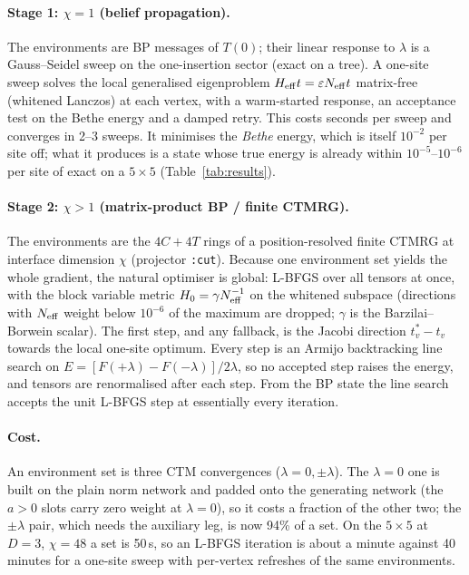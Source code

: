 \documentclass[11pt]{article}
\begin{document}
\paragraph{Stage 1: $\chi=1$ (belief propagation).} The environments are BP messages of
$T(0)$; their linear response to $\lambda$ is a Gauss--Seidel sweep on the one-insertion sector
(exact on a tree). A one-site sweep solves the local generalised eigenproblem
$H_{\rm eff}t=\varepsilon N_{\rm eff}t$ matrix-free (whitened Lanczos) at each vertex, with a
warm-started response, an acceptance test on the Bethe energy and a damped retry. This costs
seconds per sweep and converges in 2--3 sweeps. It minimises the \emph{Bethe} energy, which is
itself $10^{-2}$ per site off; what it produces is a state whose true energy is already within
$10^{-5}$--$10^{-6}$ per site of exact on a $5\times5$ (Table~\ref{tab:results}).

\paragraph{Stage 2: $\chi>1$ (matrix-product BP / finite CTMRG).} The environments are the
$4C+4T$ rings of a position-resolved finite CTMRG at interface dimension $\chi$ (projector
\texttt{:cut}). Because one environment set yields the whole gradient, the natural optimiser is
global: L-BFGS over all tensors at once, with the block variable metric $H_0=\gamma N_{\rm eff}^{-1}$
on the whitened subspace (directions with $N_{\rm eff}$ weight below $10^{-6}$ of the maximum are
dropped; $\gamma$ is the Barzilai--Borwein scalar). The first step, and any fallback, is the
Jacobi direction $t_v^\ast-t_v$ towards the local one-site optimum. Every step is an Armijo
backtracking line search on $E=[F(+\lambda)-F(-\lambda)]/2\lambda$, so no accepted step raises the
energy, and tensors are renormalised after each step. From the BP state the line search accepts
the unit L-BFGS step at essentially every iteration.

\paragraph{Cost.} An environment set is three CTM convergences ($\lambda=0,\pm\lambda$). The
$\lambda=0$ one is built on the plain norm network and padded onto the generating network
(the $a>0$ slots carry zero weight at $\lambda=0$), so it costs a fraction of the other two; the
$\pm\lambda$ pair, which needs the auxiliary leg, is now 94\% of a set. On the $5\times5$ at
$D=3$, $\chi=48$ a set is 50\,s, so an L-BFGS iteration is about a minute against 40 minutes for
a one-site sweep with per-vertex refreshes of the same environments.
\end{document}
